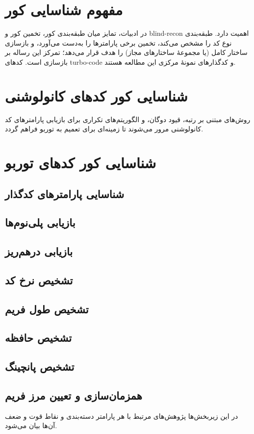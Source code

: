 \section{مفهوم شناسایی کور}
در ادبیات، تمایز میان طبقه‌بندی کور، تخمین کور و \gls{blind-recon} اهمیت دارد. طبقه‌بندی نوع کد را مشخص می‌کند، تخمین برخی پارامترها را به‌دست می‌آورد، و بازسازی ساختار کامل (یا مجموعهٔ ساختارهای مجاز) را هدف قرار می‌دهد؛ تمرکز این رساله بر بازسازی است. کدهای \gls{turbo-code} و کدگذارهای  نمونهٔ مرکزی این مطالعه هستند.

\section{شناسایی کور کدهای کانولوشنی}
روش‌های مبتنی بر رتبه، قیود دوگان، و الگوریتم‌های تکراری برای بازیابی پارامترهای کد کانولوشنی مرور می‌شوند تا زمینه‌ای برای تعمیم به توربو فراهم گردد.

\section{شناسایی کور کدهای توربو}
\subsection{شناسایی پارامترهای کدگذار}
\subsection{بازیابی پلی‌نوم‌ها}
\subsection{بازیابی درهم‌ریز}
\subsection{تشخیص نرخ کد}
\subsection{تشخیص طول فریم}
\subsection{تشخیص حافظه}
\subsection{تشخیص پانچینگ}
\subsection{همزمان‌سازی و تعیین مرز فریم}
در این زیربخش‌ها پژوهش‌های مرتبط با هر پارامتر دسته‌بندی و نقاط قوت و ضعف آن‌ها بیان می‌شود.

